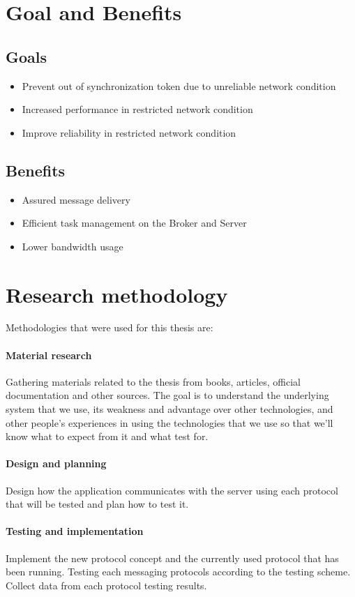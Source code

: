 \section{Goal and Benefits}
\subsection{Goals}
\begin{itemize}
	\itemsep0em
    \item Prevent out of synchronization token due to unreliable network condition
    \item Increased performance in restricted network condition
    \item Improve reliability in restricted network condition
\end{itemize}
\subsection{Benefits}
\begin{itemize}
	\itemsep0em
    \item Assured message delivery
    \item Efficient task management on the Broker and Server
    \item Lower bandwidth usage
\end{itemize}

\section{Research methodology}
Methodologies that were used for this thesis are:
\paragraph{Material research}
Gathering materials related to the thesis from books, articles, official documentation and other sources. The goal is to understand the underlying system that we use, its weakness and advantage over other technologies, and other people's experiences in using the technologies that we use so that we'll know what to expect from it and what test for.
\paragraph{Design and planning}
Design how the application communicates with the server using each protocol that will be tested and plan how to test it.
\paragraph{Testing and implementation}
Implement the new protocol concept and the currently used protocol that has been running. Testing each messaging protocols according to the testing scheme. Collect data from each protocol testing results.
